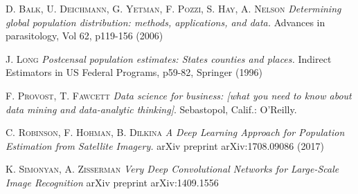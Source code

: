 \documentclass{article}
\begin{document}
\begin{thebibliography}{9}

 \textsc{D. Balk, U. Deichmann, G. Yetman, F. Pozzi, S. Hay, A. Nelson} \textit{ Determining global population distribution: methods, applications, and data.} Advances in parasitology, Vol 62, p119-156 (2006)

 \textsc{J. Long}\textit{ Postcensal population estimates: States counties and places.} Indirect Estimators in US Federal Programs, p59-82, Springer (1996)

 \textsc{F. Provost, T. Fawcett} \textit {  Data science for business: [what you need to know about data mining and data-analytic thinking]}. Sebastopol, Calif.: O'Reilly.


  \textsc{C. Robinson, F. Hohman, B. Dilkina}\textit{ A Deep Learning Approach for Population Estimation from Satellite Imagery.} arXiv preprint arXiv:1708.09086 (2017)

 \textsc{K. Simonyan, A. Zisserman} \textit{ Very Deep Convolutional Networks for Large-Scale Image Recognition} arXiv preprint arXiv:1409.1556
\end{thebibliography}
\end{document}

